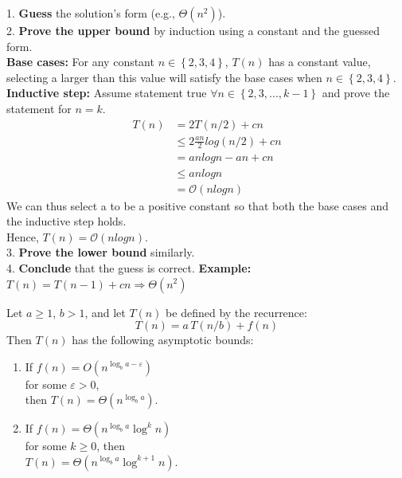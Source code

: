 \documentclass[a4paper,landscape]{article}
\newcommand{\bigo}{\mathcal{O}}
\begin{document}
\begin{multicols}{7}
1. \textbf{Guess} the solution's form (e.g., \( \Theta(n^2) \)).\\
2. \textbf{Prove the upper bound} by induction using a constant and the guessed form.\\
  \textbf{Base cases:} For any constant $n \in \left\{2,3,4\right\}$, $T(n)$ has a constant value, selecting a larger than this value will satisfy the base cases when $n \in \left\{2,3,4\right\}$. \\
  \textbf{Inductive step:} Assume statement true $\forall n \in \left\{2,3,...,k-1\right\}$ and prove the statement for $n=k$.
  \begin{equation}
  \begin{split}
    T(n) & = 2T(n/2) + cn \\[-1mm]
    & \leq 2\frac{an}{2}log(n/2)+cn \\[-1mm]
    & = anlogn-an+cn \\[-1mm]
    & \leq anlogn \\[-1mm]
    & = \bigo(nlogn)
  \end{split}
  \end{equation}
  We can thus select a to be a positive constant so that both the base cases and the inductive step holds. \\Hence, $T(n)=\bigo(nlogn)$.\\
3. \textbf{Prove the lower bound} similarly.\\
4. \textbf{Conclude} that the guess is correct.
\textbf{Example:}\\
\( T(n) = T(n - 1) + cn \Rightarrow \Theta(n^2) \)
\endtcolorbox

\tcolorbox[mybox={Master Theorem}]
Let \( a \geq 1 \), \( b > 1 \), and let \( T(n) \) be defined by the recurrence:
\[T(n) = a\,T(n/b) + f(n)\]
Then \( T(n) \) has the following asymptotic bounds:
\begin{enumerate}[noitemsep, topsep=0pt]
    \item If \( f(n) = O(n^{\log_b a - \varepsilon}) \) \\ for some \( \varepsilon > 0 \),\\
          then \( T(n) = \Theta(n^{\log_b a}) \).

    \item If \( f(n) = \Theta(n^{\log_b a} \log^k n) \) \\ for some \( k \geq 0 \),
          then \\ \( T(n)=\Theta(n^{\log_b a}\log^{k+1}n) \).


\end{enumerate}
\end{multicols}
\end{document}

